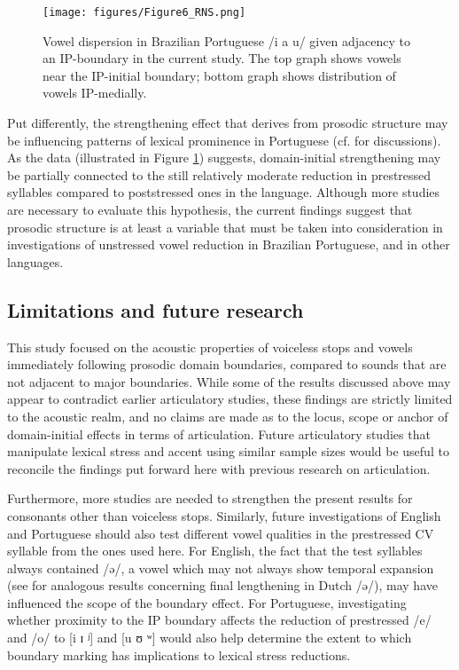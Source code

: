 \documentclass[output=paper]{langscibook}
\begin{document}
\begin{figure}%
\texttt{[image: figures/Figure6\_RNS.png]}
\caption{Vowel dispersion in Brazilian Portuguese /i a u/ given adjacency to an IP-boundary in the current study. The top graph shows vowels near the IP-initial boundary; bottom graph shows distribution of vowels IP-medially.}
\label{fig:fig6}
\end{figure}

Put differently, the strengthening effect that derives from prosodic structure may be influencing patterns of lexical prominence in Portuguese (cf. \citealt{b06, ss08} for discussions). As the data (illustrated in Figure \ref{fig:fig6}) suggests, domain-initial strengthening may be partially connected to the still relatively moderate reduction in prestressed syllables compared to poststressed ones in the language. Although more studies are necessary to evaluate this hypothesis, the current findings suggest that prosodic structure is at least a variable that must be taken into consideration in investigations of unstressed vowel reduction in Brazilian Portuguese, and in other languages.

\subsection{Limitations and future research} \label{limitations} \largerpage
This study focused on the acoustic properties of voiceless stops and vowels immediately following prosodic domain boundaries, compared to sounds that are not adjacent to major boundaries. While some of the results discussed above may appear to contradict earlier articulatory studies, these findings are strictly limited to the acoustic realm, and no claims are made as to the locus, scope or anchor of domain-initial effects in terms of articulation. Future articulatory studies that manipulate lexical stress and accent using similar sample sizes would be useful to reconcile the findings put forward here with previous research on articulation. 

Furthermore, more studies are needed to strengthen the present results for consonants other than voiceless stops. Similarly, future investigations of English and Portuguese should also test different vowel qualities in the prestressed CV syllable from the ones used here. For English, the fact that the test syllables always contained /ə/, a vowel which may not always show temporal expansion (see \citealt{c97} for analogous results concerning final lengthening in Dutch /ə/), may have influenced the scope of the boundary effect. For Portuguese, investigating whether proximity to the IP boundary affects the reduction of prestressed /e/ and /o/ to [i ɪ ʲ] and [u ʊ ʷ] would also help determine the extent to which boundary marking has implications to lexical stress reductions.
\end{document}
